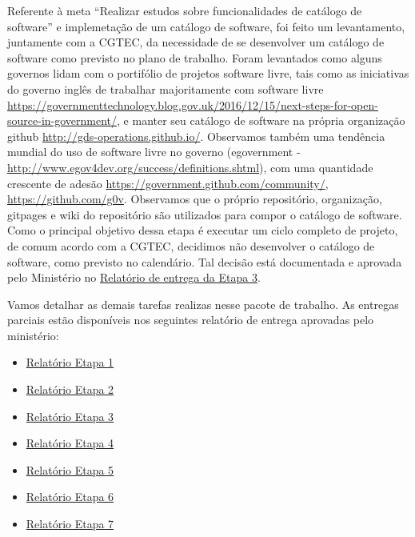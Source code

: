 Referente à meta ``Realizar estudos sobre funcionalidades de catálogo de
software'' e implemetação de um catálogo de software, foi feito um
levantamento, juntamente com a CGTEC, da necessidade de se desenvolver
um catálogo de software como previsto no plano de trabalho. Foram
levantados como alguns governos lidam com o portifólio de projetos
software livre, tais como as iniciativas do governo inglês de trabalhar
majoritamente com software livre
\url{https://governmenttechnology.blog.gov.uk/2016/12/15/next-steps-for-open-source-in-government/},
e manter seu catálogo de software na própria organização github
\url{http://gds-operations.github.io/}. Observamos também uma tendência
mundial do uso de software livre no governo (egovernment -
\url{http://www.egov4dev.org/success/definitions.shtml}), com uma
quantidade crescente de adesão
\url{https://government.github.com/community/},
\url{https://github.com/g0v}. Observamos que o próprio repositório,
organização, gitpages e wiki do repositório são utilizados para compor o
catálogo de software. Como o principal objetivo dessa etapa é executar
um ciclo completo de projeto, de comum acordo com a CGTEC, decidimos não
desenvolver o catálogo de software, como previsto no calendário. Tal
decisão está documentada e aprovada pelo Ministério no
\href{https://github.com/lappis-unb/EcossistemasSWLivre/blob/master/Relatorios/R3/RELATÓRIO\%20ETAPA\%203.md}{Relatório
de entrega da Etapa 3}.

Vamos detalhar as demais tarefas realizas nesse pacote de trabalho. As
entregas parciais estão disponíveis nos seguintes relatório de entrega
aprovadas pelo ministério:

\begin{itemize}
\item
  \href{https://github.com/lappis-unb/EcossistemasSWLivre/blob/master/Relatorios/R1/RELATÓRIO\%20ETAPA\%201.pdf}{Relatório
  Etapa 1}
\item
  \href{https://github.com/lappis-unb/EcossistemasSWLivre/blob/master/Relatorios/R2/RELATÓRIO\%20ETAPA\%202.pdf}{Relatório
  Etapa 2}
\item
  \href{https://github.com/lappis-unb/EcossistemasSWLivre/blob/master/Relatorios/R3/RELATÓRIO\%20ETAPA\%203.md}{Relatório
  Etapa 3}
\item
  \href{https://github.com/lappis-unb/EcossistemasSWLivre/blob/master/Relatorios/R4/RELATÓRIO\%20ETAPA\%204.pdf}{Relatório
  Etapa 4}
\item
  \href{https://github.com/lappis-unb/EcossistemasSWLivre/blob/master/Relatorios/R5/RELATÓRIO\%20ETAPA\%205.pdf}{Relatório
  Etapa 5}
\item
  \href{https://github.com/lappis-unb/EcossistemasSWLivre/blob/master/Relatorios/R6/RELATÓRIO\%20ETAPA\%206.pdf}{Relatório
  Etapa 6}
\item
  \href{https://github.com/lappis-unb/EcossistemasSWLivre/blob/master/Relatorios/R7/RELATÓRIO\%20ETAPA\%207.pdf}{Relatório
  Etapa 7}
\end{itemize}

